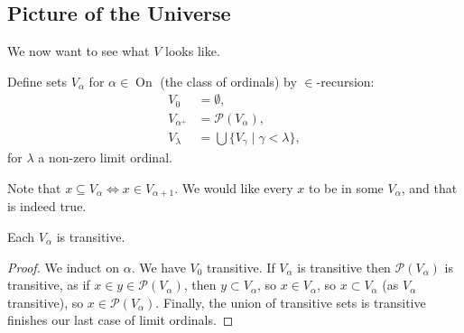 \documentclass[a3paper, 10pt]{article}
\newcommand{\on}{\operatorname{On}}
\begin{document}
\begin{multicols*}{5}
\subsection{Picture of the Universe}

We now want to see what $V$ looks like.

\begin{definition}
  Define sets $V_\alpha$ for $\alpha \in \on$ (the class of ordinals) by $\in$-recursion:
  \begin{align*}
    V_0 &= \emptyset, \\
    V_{\alpha^+} &= \mathcal{P}(V_\alpha), \\
    V_\lambda &= \bigcup \{V_\gamma \mid \gamma < \lambda\},
  \end{align*}
  for $\lambda$ a non-zero limit ordinal.
\end{definition}

\begin{center}
\end{center}

Note that $x \subseteq V_{\alpha} \Leftrightarrow x \in V_{\alpha+1}$. We would like every $x$ to be in some $V_\alpha$, and that is indeed true.

\begin{lemma}
  Each $V_\alpha$ is transitive. 
\end{lemma}
\begin{proof}
  We induct on $\alpha$. We have $V_0$ transitive. If $V_\alpha$ is transitive then $\mathcal{P}(V_\alpha)$ is transitive, as if $x \in y \in \mathcal{P}(V_\alpha)$, then $y \subset V_\alpha$, so $x \in V_\alpha$, so $x \subset V_\alpha$ (as $V_\alpha$ transitive), so $x \in \mathcal{P}(V_\alpha)$. Finally, the union of transitive sets is transitive finishes our last case of limit ordinals.
\end{proof}


\end{multicols*}
\end{document}

